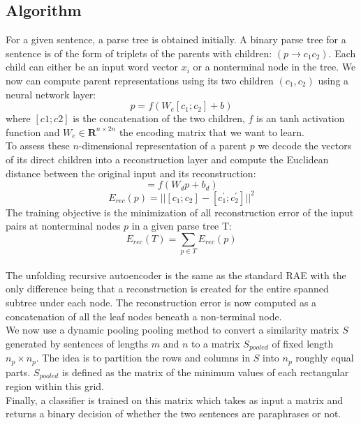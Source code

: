 \documentclass[conference]{IEEEtran}
\begin{document}
\subsection{Algorithm}
For a given sentence, a parse tree is obtained initially. A binary parse tree for a sentence is of the form of triplets of the parents with children: $(p \rightarrow c_1c_2)$. Each child can either be an input word vector $x_i$ or a nonterminal node in the tree. We now can compute parent representations using its two children $(c_1, c_2)$ using a neural network layer:\\
\begin{equation}
p = f(W_e[c_1;c_2] + b)
\end{equation}
where $[c1;c2]$ is the concatenation of the two children, $f$ is an tanh activation function and $W_e \in \mathbf{R}^{n \times 2n}$ the encoding matrix that we want to learn.\\
To assess these $n$-dimensional representation of a parent $p$ we decode the vectors of its direct children into a reconstruction layer and compute the Euclidean distance between the original input and its reconstruction:\\
\begin{equation}
[c^\prime_1;c^\prime_2] = f(W_dp + b_d)
\end{equation}
\begin{equation}
E_{rec}(p) = ||[c_1;c_2] - [c^\prime_1;c^\prime_2]||^2
\end{equation}
The training objective is the minimization of all reconstruction error of the input pairs at nonterminal nodes $p$ in a given parse tree T:\\
\begin{equation}
E_{rec}(T) = \sum_{p \in T} E_{rec}(p)
\end{equation}\\
The unfolding recursive autoencoder is the same as the standard RAE with the only difference being that a reconstruction is created for the entire spanned subtree under each node. The reconstruction error is now computed as a concatenation of all the leaf nodes beneath a non-terminal node.\\
We now use a dynamic pooling pooling method to convert a similarity matrix $S$ generated by sentences of lengths $m$ and $n$ to a matrix $S_{pooled}$ of fixed length $n_p \times n_p$. The idea is to partition the rows and columns in $S$ into $n_p$ roughly equal parts. $S_{pooled}$ is defined as the matrix of the minimum values of each rectangular region within this grid.\\
Finally, a classifier is trained on this matrix which takes as input a matrix and returns a binary decision of whether the two sentences are paraphrases or not.\\
\end{document}
